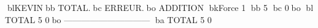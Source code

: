 blKEVINbb           TOTAL.bc      ERREUR.bo
ADDITION
bkForce      1     bb  5	bc        0bo
bl TOTAL             5	        0bo
------------------------------
ba TOTAL             5	        0
